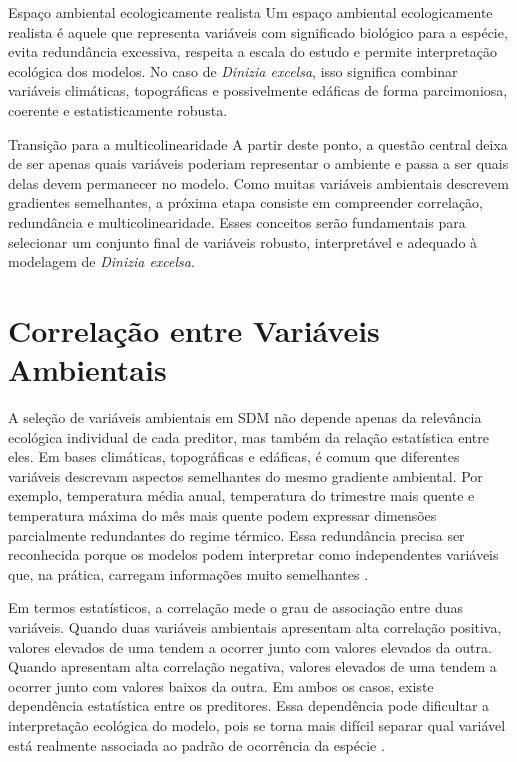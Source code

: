 \begin{caixaconceitual}{Espaço ambiental ecologicamente realista}
	Um espaço ambiental ecologicamente realista é aquele que representa variáveis com significado biológico para a espécie, evita redundância excessiva, respeita a escala do estudo e permite interpretação ecológica dos modelos. No caso de \textit{Dinizia excelsa}, isso significa combinar variáveis climáticas, topográficas e possivelmente edáficas de forma parcimoniosa, coerente e estatisticamente robusta.
\end{caixaconceitual}

\begin{caixaatencao}{Transição para a multicolinearidade}
	A partir deste ponto, a questão central deixa de ser apenas quais variáveis poderiam representar o ambiente e passa a ser quais delas devem permanecer no modelo. Como muitas variáveis ambientais descrevem gradientes semelhantes, a próxima etapa consiste em compreender correlação, redundância e multicolinearidade. Esses conceitos serão fundamentais para selecionar um conjunto final de variáveis robusto, interpretável e adequado à modelagem de \textit{Dinizia excelsa}.
\end{caixaatencao}


\section{Correlação entre Variáveis Ambientais}

A seleção de variáveis ambientais em SDM não depende apenas da relevância ecológica individual de cada preditor, mas também da relação estatística entre eles. Em bases climáticas, topográficas e edáficas, é comum que diferentes variáveis descrevam aspectos semelhantes do mesmo gradiente ambiental. Por exemplo, temperatura média anual, temperatura do trimestre mais quente e temperatura máxima do mês mais quente podem expressar dimensões parcialmente redundantes do regime térmico. Essa redundância precisa ser reconhecida porque os modelos podem interpretar como independentes variáveis que, na prática, carregam informações muito semelhantes \parencite{dormann2013collinearity,guisan2017habitat}.

Em termos estatísticos, a correlação mede o grau de associação entre duas variáveis. Quando duas variáveis ambientais apresentam alta correlação positiva, valores elevados de uma tendem a ocorrer junto com valores elevados da outra. Quando apresentam alta correlação negativa, valores elevados de uma tendem a ocorrer junto com valores baixos da outra. Em ambos os casos, existe dependência estatística entre os preditores. Essa dependência pode dificultar a interpretação ecológica do modelo, pois se torna mais difícil separar qual variável está realmente associada ao padrão de ocorrência da espécie \parencite{dormann2013collinearity,franklin2010mapping}.

